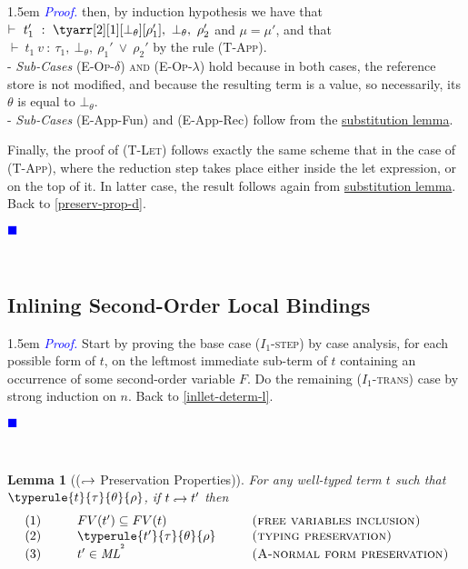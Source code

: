 \documentclass[a4paper,11pt,oneside]{article}
\theoremstyle{plain}
\newtheorem{lemma}[definition]{Lemma}
\renewenvironment{proof}{\noindent \begin{adjustwidth}{1.5em}{} \textcolor{blue}{\textit{Proof.}}}
{{\begin{tiny}\textcolor{blue}{$\blacksquare$}\end{tiny}}
\end{adjustwidth}~\\\noindent}
\newcommand{\bwedge}{\boldsymbol{~\wedge~}}
\newcommand{\bvee}{\boldsymbol{~\vee~}}
\newcommand{\brarr}{\boldsymbol{~\Rightarrow~}}
\newcommand{\typing}[4]{\vdash~#1~:~#2,~#3,~#4}
\newcommand{\bth}{\bot_\theta}
\newcommand{\inlsrc}{\textit{ML}^{^2}}
\newcommand{\inlT}{\inlsrc}
\newcommand{\hookdownarrow}{\mathrel{\rotatebox[origin=c]{180}{$\hookleftarrow$}}}
\newcommand{\inlletarr}{\hookdownarrow}
\newcommand{\inlletstar}{\hookdownarrow^{\star}}
\newcommand{\inlletplus}{\inlletstar}
\newcommand{\inllet}[2]{#1 \hookdownarrow #2}
\begin{document}
\begin{proof}
then, by induction hypothesis we have that $\typing{t'_1}{\tyarr[2][1][\bth][\rho_1']}{\bth}{\rho_2'}$ and $\mu = \mu'$, and that $\typing{t_1~v}{\tau_1}{\bth}{\rho_1' \bvee \rho_2'}$ by the rule \textsc{(T-App)}. \\

- \textit{Sub-Cases}	\textsc{(E-Op-$\delta$) and (E-Op-$\lambda$)} hold because in both cases, the reference store is not modified, and because the resulting term is a value, so necessarily, its $\theta$ is equal to $\bth$. \\
		
- \textit{Sub-Cases} (E-App-Fun) and  (E-App-Rec) follow from the \hyperlink{subst-lemma}{substitution lemma}.

Finally, the proof of \textsc{(T-Let)} follows exactly the same scheme that in the case of \textsc{(T-App)}, where the reduction step takes place either inside the let expression, or on the top of it.
 In latter case, the result follows again from \hyperlink{subst-lemma}{substitution lemma}. Back to \ref{preserv-prop-d}.
\end{proof}  	

	\subsection{Inlining Second-Order Local Bindings}
	


\begin{proof}
Start by proving the base case (\textsc{$I_1$-step}) by case analysis, for each possible form of $t$, on the leftmost immediate sub-term of $t$ containing an occurrence of some second-order variable $F$. 
	  Do the remaining  (\textsc{$I_1$-trans}) case	by strong induction on $n$.  Back to \ref{inllet-determ-l}.
\end{proof}	
	
\begin{lemma}[($\inlletarr$ Preservation Properties)]
For any well-typed term $t$ such that\\ $\typerule{t}{\tau}{\theta}{\rho}$, if $\inllet{t}{t'}$ then
\begin{displaymath}
\begin{array}{l@{\hspace*{1cm}}l@{\hspace*{1cm}}l}
	(1)& FV(t') \subseteq FV(t) & \textsc{(free variables inclusion)} \\
	(2)& \typerule{t'}{\tau}{\theta}{\rho} &\textsc{(typing preservation)} \\
	(3)& t' \in \inlT & \textsc{(A-normal form preservation)}
\end{array}
\end{displaymath}
 \label{inllet-prop-p}
\end{lemma}
\end{document}
